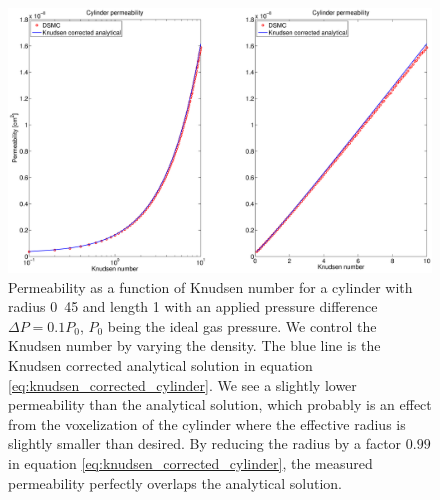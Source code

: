 \begin{figure}[H]
\begin{center}
\includegraphics[width=\textwidth, trim=5cm 0cm 5cm 0cm, clip]{DSMC/figures/cylinder_knudsen_permeability.eps}
\end{center}
\caption{Permeability as a function of Knudsen number for a cylinder with radius \unit{0.45}{\micro\meter} and length \unit{1}{\micro\meter} with an applied pressure difference $\Delta P = 0.1P_0$, $P_0$ being the ideal gas pressure. We control the Knudsen number by varying the density. The blue line is the Knudsen corrected analytical solution in equation \eqref{eq:knudsen_corrected_cylinder}. We see a slightly lower permeability than the analytical solution, which probably is an effect from the voxelization of the cylinder where the effective radius is slightly smaller than desired. By reducing the radius by a factor $0.99$ in equation \eqref{eq:knudsen_corrected_cylinder}, the measured permeability perfectly overlaps the analytical solution.}
\label{fig:one_cylinder_varying_knudsen}
\end{figure}

